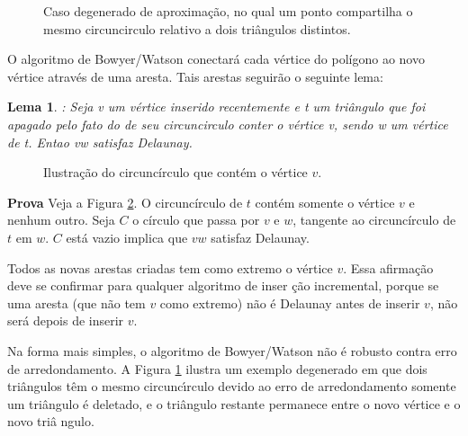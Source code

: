 \documentclass[12pt,a4paper]{book}
\newtheorem{Lem}{Lema}
\begin{document}
\begin{figure}[htbp]
  \begin{center}
    \leavevmode
    
    \caption{Caso degenerado de aproxima\c{c}\~{a}o, no qual um ponto compartilha o mesmo
             circuncirculo relativo a dois tri\^{a}ngulos distintos.}
    \label{fig10_chapter6}
  \end{center}
\end{figure}

O algoritmo de Bowyer/Watson conectar\'{a} cada v\'{e}rtice do pol\'{i}gono ao novo v\'{e}rtice
atrav\'{e}s de uma aresta. Tais arestas seguir\~{a}o o seguinte lema:

\begin{Lem}
: Seja v um v\'{e}rtice inserido recentemente e t um tri\^{a}ngulo que foi apagado pelo fato do
de seu circuncirculo conter o v\'{e}rtice v, sendo w um v\'{e}rtice de t. Entao vw satisfaz Delaunay.
\end{Lem}

\begin{figure}[htbp]
  \begin{center}
    \leavevmode
    
    \caption{Ilustra\c{c}\~{a}o do circunc\'{i}rculo que cont\'{e}m o v\'{e}rtice $v$.}
    \label{fig11_chapter6}
  \end{center}
\end{figure}

\textbf{Prova} Veja a Figura \ref{fig11_chapter6}. O circunc\'{i}rculo de
$t$ cont\'{e}m somente o v\'{e}rtice $v$ e nenhum outro. Seja $C$ o c\'{i}rculo que passa por
$v$ e $w$, tangente ao circunc\'{i}rculo de $t$ em $w$. $C$ est\'{a} vazio implica que $vw$
satisfaz Delaunay.

Todos as novas arestas criadas tem como extremo o v\'{e}rtice $v$.
Essa afirma\c{c}\~{a}o deve se confirmar para qualquer algoritmo de inser%
\c{c}\~{a}o incremental, porque se uma aresta (que n\~{a}o tem $v$ como
extremo) n\~{a}o \'{e} Delaunay antes de inserir $v$, n\~{a}o ser\'{a}
depois de inserir $v$.

Na forma mais simples, o algoritmo de Bowyer/Watson n\~{a}o \'{e}
robusto contra erro de arredondamento. A Figura \ref{fig10_chapter6} ilustra um exemplo
degenerado em que dois tri\^{a}ngulos t\^{e}m o mesmo circunc\'{\i}rculo
devido ao erro de arredondamento somente um tri\^{a}ngulo \'{e} deletado, e
o tri\^{a}ngulo restante permanece entre o novo v\'{e}rtice e o novo tri\^{a}%
ngulo. 
\end{document}
